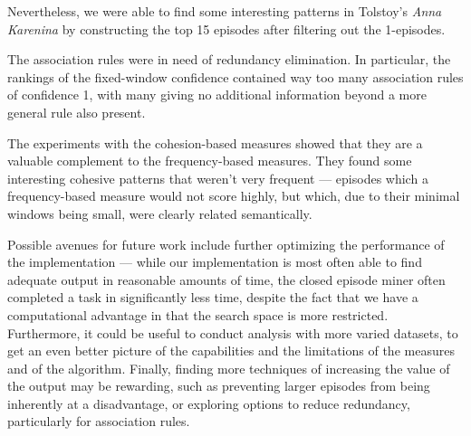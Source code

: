 Nevertheless, we were able to find some interesting patterns in Tolstoy's \emph{Anna Karenina} by constructing the top 15 episodes after filtering out the 1-episodes.

The association rules were in need of redundancy elimination. In particular, the rankings of the fixed-window confidence contained way too many association rules of confidence 1, with many giving no additional information beyond a more general rule also present.

The experiments with the cohesion-based measures showed that they are a valuable complement to the frequency-based measures. They found some interesting cohesive patterns that weren't very frequent --- episodes which a frequency-based measure would not score highly, but which, due to their minimal windows being small, were clearly related semantically.

Possible avenues for future work include further optimizing the performance of the implementation --- while our implementation is most often able to find adequate output in reasonable amounts of time, the closed episode miner often completed a task in significantly less time, despite the fact that we have a computational advantage in that the search space is more restricted. Furthermore, it could be useful to conduct analysis with more varied datasets, to get an even better picture of the capabilities and the limitations of the measures and of the algorithm. Finally, finding more techniques of increasing the value of the output may be rewarding, such as preventing larger episodes from being inherently at a disadvantage, or exploring options to reduce redundancy, particularly for association rules.
